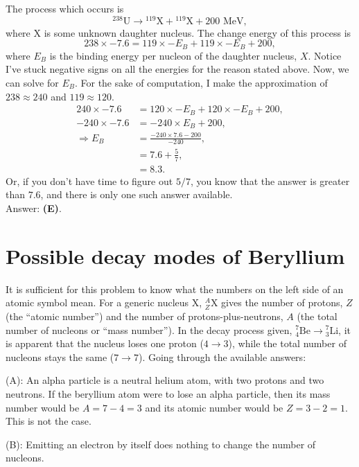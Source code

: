 \documentclass[11pt]{paper}
\newcommand{\answer}[1]{Answer: \textbf{(#1)}.}
\begin{document}
The process which occurs is
\begin{equation}
{}^{238}\text{U} \rightarrow {}^{119}\text{X} + {}^{119}\text{X} + 200\text{ MeV},
\end{equation}
where $\text{X}$ is some unknown daughter nucleus.  The change energy of this process is
\begin{equation}
238 \times -7.6 = 119 \times -E_B + 119 \times -E_B + 200,
\end{equation}
where $E_B$ is the binding energy per nucleon of the daughter nucleus, $X$.  Notice I've stuck negative signs on all the energies for the reason stated above.  Now, we can solve for $E_B$.  For the sake of computation, I make the approximation of $238 \approx 240$ and $119\approx 120$.
\begin{align}
240 \times -7.6 &= 120 \times -E_B + 120 \times -E_B + 200,\\
-240 \times -7.6 &= -240 \times E_B + 200,\\
\Rightarrow E_B &= \frac{-240\times7.6-200}{-240},\\
&=7.6+\frac{5}{7},\\
&=8.3.
\end{align}
Or, if you don't have time to figure out $5/7$, you know that the answer is greater than $7.6$, and there is only one such answer available.\\

\answer{E}

\section{Possible decay modes of Beryllium}
It is sufficient for this problem to know what the numbers on the left side of an atomic symbol mean.  For a generic nucleus $\text{X}$, ${}^A_Z \text{X}$ gives the number of protons, $Z$ (the ``atomic number'') and the number of protons-plus-neutrons, $A$ (the total number of nucleons or ``mass number'').  In the decay process given, ${}^7_4\text{Be}\rightarrow{}^7_3\text{Li}$, it is apparent that the nucleus loses one proton ($4\rightarrow3$), while the total number of nucleons stays the same ($7\rightarrow7$).  Going through the available answers:

(A): An alpha particle is a neutral helium atom, with two protons and two neutrons.  If the beryllium atom were to lose an alpha particle, then its mass number would be $A = 7-4=3$ and its atomic number would be $Z=3-2=1$.  This is not the case.

(B): Emitting an electron by itself does nothing to change the number of nucleons.
\end{document}

